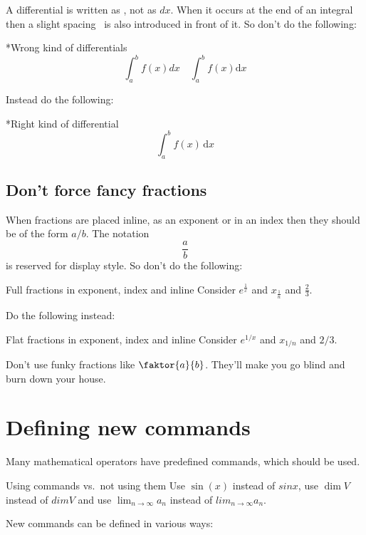 A differential is written as , not as $dx$.
When it occurs at the end of an integral then a slight spacing~\comname{\,} is also introduced in front of it.
So don’t do the following:
\begin{showlatex}*{Wrong kind of differentials}
\[
  \int_a^b f(x) dx
  \quad
  \int_a^b f(x) \mathrm{d}x
\]
\end{showlatex}
Instead do the following:
\begin{showlatex}*{Right kind of differential}
\[
  \int_a^b f(x) \,\mathrm{d}x
\]
\end{showlatex}



\subsection{Don’t force fancy fractions}

When fractions are placed inline, as an exponent or in an index then they should be of the form $a/b$.
The notation
\[
  \frac{a}{b}
\]
is reserved for display style.
So don’t do the following:
\begin{showlatex}{Full fractions in exponent, index and inline}
Consider $e^{\frac{1}{x}}$ and $x_{\frac{1}{n}}$ and $\frac{2}{3}$.
\end{showlatex}
Do the following instead:
\begin{showlatex}{Flat fractions in exponent, index and inline}
Consider $e^{1/x}$ and $x_{1/n}$ and $2/3$.
\end{showlatex}

Don’t use funky fractions like $\faktor{a}{b}$. They’ll make you go blind and burn down your house.







\section{Defining new commands}

Many mathematical operators have predefined commands, which should be used.
\begin{showlatex}{Using commands vs.\ not using them}
Use $\sin(x)$ instead of $sin x$, use $\dim V$ instead of $dim V$ and use $\lim_{n \to \infty} a_n$ instead of $lim_{n \to \infty} a_n$.
\end{showlatex}
New commands can be defined in various ways:


